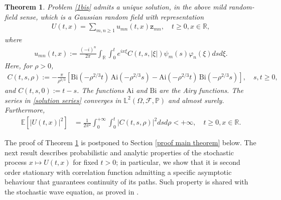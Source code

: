\documentclass{article}
\newtheorem{theorem}{Theorem}[section]
\begin{document}
\begin{theorem}\label{main theorem}
Problem \eqref{1bis} admits a unique solution, in the above mild random-field sense, which is a Gaussian random field with representation
\begin{align}\label{solution series}
U(t,x)=\sum_{m,n\geq 1}u_{mn}(t,x)\mathtt{z}_{mn},\quad t\geq 0,x\in\mathbb{R},
\end{align}
where
\begin{align*}
u_{mn}(t,x):=\frac{(-i)^n}{2\pi}\int_{\mathbb{R}}\int_{0}^te^{ix\xi}C(t,s,|\xi|)\psi_m(s)\varphi_n(\xi)dsd\xi.
\end{align*}
Here, for \(\rho>0\),
\begin{align}\label{def C}
C(t,s,\rho):= -\frac{\pi}{\rho^{2/3}}\!
\left[ \mathrm{Bi}(-\rho^{2/3}t)\,\mathrm{Ai}(-\rho^{2/3}s)
- \mathrm{Ai}(-\rho^{2/3}t)\,\mathrm{Bi}(-\rho^{2/3}s)\right],\quad s,t\geq 0, 
\end{align}
and \(C(t,s,0):=t-s\). The functions $\mathrm{Ai}$ and $\mathrm{Bi}$ are the Airy functions. The series in \eqref{solution series} converges in $\mathbb{L}^2(\Omega,\mathcal{F},\mathbb{P})$ and almost surely. Furthermore,
\begin{align}\label{norma}
\mathbb{E}[|U(t,x)|^2]&=\frac{1}{2\pi^2}\int_0^{+\infty}\int_0^{t}\left|C(t,s,\rho)\right|^2ds d\rho<+\infty,\quad t\geq 0,x\in\mathbb{R}.
\end{align}
\end{theorem}

The proof of Theorem \ref{main theorem} is postponed to Section \ref{proof main theorem} below. The next result describes probabilistic and analytic properties of the stochastic process $x\mapsto U(t,x)$ for fixed $t>0$; in particular, we show that it is second order stationary with correlation function admitting a specific asymptotic behaviour that guarantees continuity of its paths. Such property is shared with the stochastic wave equation, as proved in \cite{Orsingher}.
\end{document}
